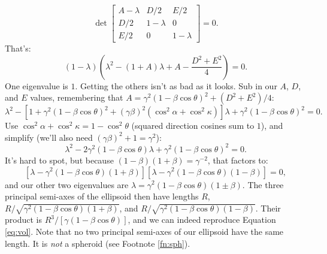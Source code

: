 \documentclass[12pt]{article}
\begin{document}
\begin{equation*}
\det
\begin{bmatrix}
A - \lambda & D/2 & E/2 \\
D/2 & 1 - \lambda & 0 \\
E/2 & 0 & 1 - \lambda
\end{bmatrix}
= 0 .
\end{equation*}
That's:
\begin{equation*}
\left(1 - \lambda \right) \left( \lambda^2 - \left( 1 + A \right)\lambda + A - \dfrac{D^2 + E^2}{4} \right) = 0.
\end{equation*}
One eigenvalue is $1$. Getting the others isn't as bad as it looks. Sub in our $A$, $D$, and $E$ values, remembering that $A = \gamma^2 (1 - \beta \cos \theta)^2 + (D^2 + E^2)/4$:
\begin{equation*}
\lambda^2 - \left[ 1 + \gamma^2 (1 - \beta \cos \theta)^2 + (\gamma \beta)^2 ( \cos^2 \alpha + \cos^2 \kappa ) \right] \lambda + \gamma^2 (1 - \beta \cos \theta)^2 = 0.
\end{equation*}
Use $\cos^2 \alpha + \cos^2 \kappa = 1 - \cos^2 \theta$ (squared direction cosines sum to $1$), and simplify (we'll also need $(\gamma \beta)^2 + 1 = \gamma^2$):
\begin{equation*}
\lambda^2 - 2 \gamma^2 ( 1 - \beta \cos \theta ) \lambda + \gamma^2 (1 - \beta \cos \theta)^2 = 0.
\end{equation*}
It's hard to spot, but because $(1 - \beta)(1 + \beta) = \gamma^{-2}$, that factors to:
\begin{equation*}
\left[ \lambda - \gamma^2 (1 - \beta \cos \theta) (1 + \beta) \right] \left[ \lambda - \gamma^2 (1 - \beta \cos \theta) (1 - \beta) \right] = 0,
\end{equation*}
and our other two eigenvalues are $\lambda = \gamma^2 (1 - \beta \cos \theta)(1 \pm \beta)$. The three principal semi-axes of the ellipsoid then have lengths $R$, $R /  \sqrt{\gamma^2 (1 - \beta \cos \theta)(1 + \beta)}$, and $R / \sqrt{\gamma^2 (1 - \beta \cos \theta)(1 - \beta)}$. Their product is $R^3 / [\gamma(1 - \beta \cos \theta)]$, and we can indeed reproduce Equation \ref{eq:vol}. Note that no two principal semi-axes of our ellipsoid have the same length. It is \emph{not} a spheroid (see Footnote \ref{fn:sph}).
\end{document}
